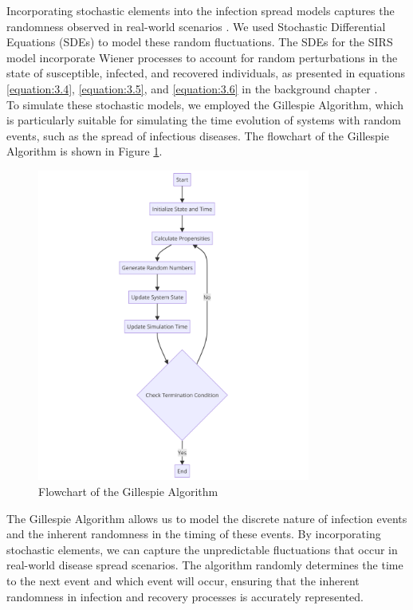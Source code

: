 Incorporating stochastic elements into the infection spread models captures the randomness observed in real-world scenarios \cite{liu2020}. We used Stochastic Differential Equations (SDEs) to model these random fluctuations. The SDEs for the SIRS model incorporate Wiener processes to account for random perturbations in the state of susceptible, infected, and recovered individuals, as presented in equations \ref{equation:3.4}, \ref{equation:3.5}, and \ref{equation:3.6} in the background chapter \cite{paladini2011}.\\

To simulate these stochastic models, we employed the Gillespie Algorithm, which is particularly suitable for simulating the time evolution of systems with random events, such as the spread of infectious diseases. The flowchart of the Gillespie Algorithm is shown in Figure \ref{fig:gillespie_algorithm}.

\begin{figure}[H]
    \centering
    \includegraphics[width=0.8\textwidth]{flowchart_algorithm.png}
    \caption{Flowchart of the Gillespie Algorithm}
    \label{fig:gillespie_algorithm}
\end{figure}

The Gillespie Algorithm allows us to model the discrete nature of infection events and the inherent randomness in the timing of these events. By incorporating stochastic elements, we can capture the unpredictable fluctuations that occur in real-world disease spread scenarios. The algorithm randomly determines the time to the next event and which event will occur, ensuring that the inherent randomness in infection and recovery processes is accurately represented.

